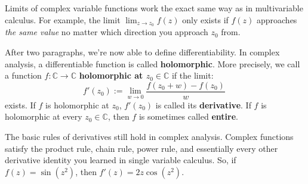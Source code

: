 \documentclass[11pt, oneside]{article}   	%
\theoremstyle{definition}
\begin{document}
Limits of complex variable functions work the exact same way as in multivariable calculus. For example, the limit 
$\lim_{z\rightarrow z_0} f(z)$ only exists if $f(z)$ approaches \textit{the same value} no matter which direction you approach 
$z_0$ from. 

After two paragraphs, we're now able to define differentiability. In complex analysis, a differentiable function is called 
\textbf{holomorphic}. More precisely, we call a function $f : \mathbb C\rightarrow\mathbb C$ \textbf{holomorphic at $z_0\in
\mathbb C$} if the limit:
\begin{equation}
	f'(z_0) := \lim_{w\rightarrow 0} \frac{f(z_0 + w) - f(z_0)}{w}~
	\label{eq:derivative}
\end{equation}
exists. If $f$ is holomorphic at $z_0$, $f'(z_0)$ is called its \textbf{derivative}. If $f$ is holomorphic at every $z_0\in\mathbb 
C$, then $f$ is sometimes called \textbf{entire}. 

The basic rules of derivatives still hold in complex analysis. Complex functions satisfy the product rule, chain rule, 
power rule, and essentially every other derivative identity you learned in single variable calculus. So, if $f(z) = \sin(z^2)$, 
then $f'(z) = 2z\cos(z^2)$. 
\end{document}
